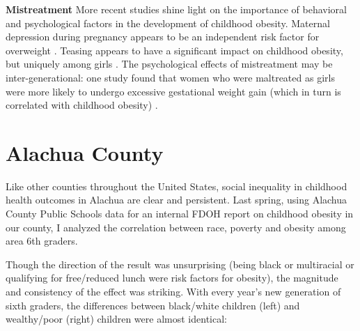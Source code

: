 \begin{multicols}{2}
\textbf{Mistreatment} More recent studies shine light on the importance of behavioral and psychological factors in the development of childhood obesity.  Maternal depression during pregnancy appears to be an independent risk factor for overweight \cite{Taveras2010}.  Teasing appears to have a significant impact on childhood obesity, but uniquely among girls \cite{Feeg2014}. The psychological effects of mistreatment may be inter-generational: one study found that women who were maltreated as girls were more likely to undergo excessive gestational weight gain (which in turn is correlated with childhood obesity) \cite{Diesel2014}.

\section*{Alachua County}
Like other counties throughout the United States, social inequality in childhood health outcomes in Alachua are clear and persistent.  Last spring, using Alachua County Public Schools data for an internal FDOH report on childhood obesity in our county, I analyzed the correlation between race, poverty and obesity among area 6th graders. %

Though the direction of the result was unsurprising (being black or multiracial or qualifying for free/reduced lunch were risk factors for obesity), the magnitude and consistency of the effect was striking.  With every year's new generation of sixth graders, the differences between black/white children (left) and wealthy/poor (right) children were almost identical:\\


\end{multicols}
